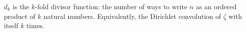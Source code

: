 \begin{definition}[d]
\label{d}
\leanok
$d_k$ is the $k$-fold divisor function: the number of ways to write $n$ as an ordered
    product of $k$ natural numbers. Equivalently, the Dirichlet convolution of $\zeta$ with
    itself $k$ times.
\end{definition}
